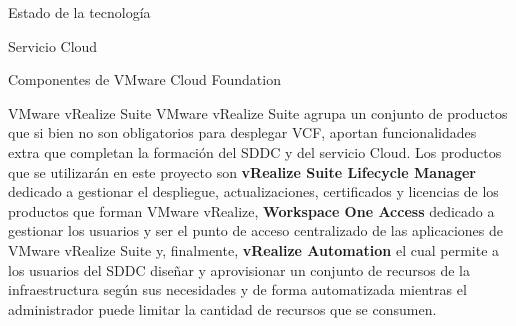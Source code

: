 \begin{chapter}{Estado de la tecnología}
\begin{section}{Servicio Cloud}
\begin{subsection}{Componentes de VMware Cloud Foundation}
    \begin{subsubsection}{VMware vRealize Suite}
        VMware vRealize Suite agrupa un conjunto de productos que si bien no son obligatorios para desplegar VCF, aportan funcionalidades extra que completan la formación del SDDC y del servicio Cloud. Los productos que se utilizarán en este proyecto son \textbf{vRealize Suite Lifecycle Manager} dedicado a gestionar el despliegue, actualizaciones, certificados y licencias de los productos que forman VMware vRealize, \textbf{Workspace One Access} dedicado a gestionar los usuarios y ser el punto de acceso centralizado de las aplicaciones de VMware vRealize Suite y, finalmente, \textbf{vRealize Automation} el cual permite a los usuarios del SDDC diseñar y aprovisionar un conjunto de recursos de la infraestructura según sus necesidades y de forma automatizada mientras el administrador puede limitar la cantidad de recursos que se consumen.
    \end{subsubsection}
    \end{subsection}
    

\end{section}
\end{chapter}
